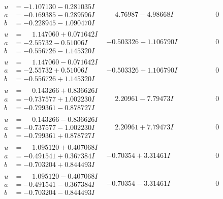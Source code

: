 \documentclass[1p]{elsarticle_modified}
\theoremstyle{definition}
\begin{document}
$$\begin{array}{c|c|c}
\begin{aligned}
u &= -1.107130 - 0.281035 I \\
a &= -0.169385 - 0.289596 I \\
b &= -0.228945 - 1.090470 I\end{aligned}
 & \phantom{-}4.76987 - 4.98668 I & \phantom{-0.000000 } 0 \\ \hline\begin{aligned}
u &= \phantom{-}1.147060 + 0.071642 I \\
a &= -2.55732 - 0.51006 I \\
b &= -0.556726 - 1.145320 I\end{aligned}
 & -0.503326 - 1.106790 I & \phantom{-0.000000 } 0 \\ \hline\begin{aligned}
u &= \phantom{-}1.147060 - 0.071642 I \\
a &= -2.55732 + 0.51006 I \\
b &= -0.556726 + 1.145320 I\end{aligned}
 & -0.503326 + 1.106790 I & \phantom{-0.000000 } 0 \\ \hline\begin{aligned}
u &= \phantom{-}0.143266 + 0.836626 I \\
a &= -0.737577 + 1.002230 I \\
b &= -0.799361 - 0.878727 I\end{aligned}
 & \phantom{-}2.20961 - 7.79473 I & \phantom{-0.000000 } 0 \\ \hline\begin{aligned}
u &= \phantom{-}0.143266 - 0.836626 I \\
a &= -0.737577 - 1.002230 I \\
b &= -0.799361 + 0.878727 I\end{aligned}
 & \phantom{-}2.20961 + 7.79473 I & \phantom{-0.000000 } 0 \\ \hline\begin{aligned}
u &= \phantom{-}1.095120 + 0.407068 I \\
a &= -0.491541 + 0.367384 I \\
b &= -0.703204 + 0.844493 I\end{aligned}
 & -0.70354 + 3.31461 I & \phantom{-0.000000 } 0 \\ \hline\begin{aligned}
u &= \phantom{-}1.095120 - 0.407068 I \\
a &= -0.491541 - 0.367384 I \\
b &= -0.703204 - 0.844493 I\end{aligned}
 & -0.70354 - 3.31461 I & \phantom{-0.000000 } 0 \\ \hline\begin{aligned}

\end{aligned}
\end{array}$$
\end{document}
